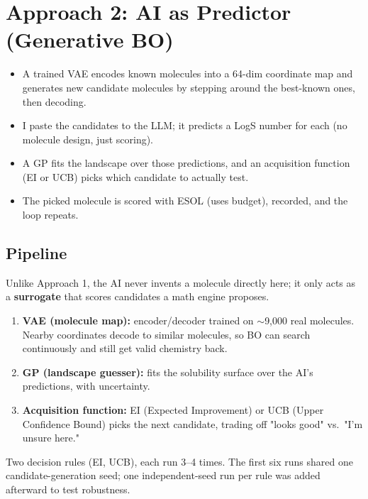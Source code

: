 \section{Approach 2: AI as Predictor (Generative BO)}
\begin{itemize}
    \item A trained VAE encodes known molecules into a 64-dim coordinate map and generates new candidate molecules by stepping around the best-known ones, then decoding.
    \item I paste the candidates to the LLM; it predicts a LogS number for each (no molecule design, just scoring).
    \item A GP fits the landscape over those predictions, and an acquisition function (EI or UCB) picks which candidate to actually test.
    \item The picked molecule is scored with ESOL (uses budget), recorded, and the loop repeats.
\end{itemize}

\subsection{Pipeline}
Unlike Approach 1, the AI never invents a molecule directly here; it only acts as a \textbf{surrogate} that scores candidates a math engine proposes.

\begin{enumerate}
    \item \textbf{VAE (molecule map):} encoder/decoder trained on $\sim$9,000 real molecules. Nearby coordinates decode to similar molecules, so BO can search continuously and still get valid chemistry back.
    \item \textbf{GP (landscape guesser):} fits the solubility surface over the AI's predictions, with uncertainty.
    \item \textbf{Acquisition function:} EI (Expected Improvement) or UCB (Upper Confidence Bound) picks the next candidate, trading off "looks good" vs.\ "I'm unsure here."
\end{enumerate}

Two decision rules (EI, UCB), each run 3--4 times. The first six runs shared one candidate-generation seed; one independent-seed run per rule was added afterward to test robustness.

